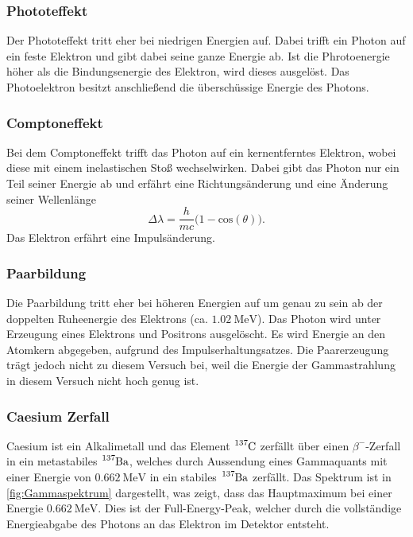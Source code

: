 \subsubsection{Phototeffekt}
\label{subsubsec:Phototeffekt}
Der Phototeffekt tritt eher bei niedrigen Energien auf. Dabei trifft ein Photon auf ein feste Elektron und gibt dabei seine ganze Energie ab. Ist die Phrotoenergie höher als die Bindungsenergie
des Elektron, wird dieses ausgelöst. Das Photoelektron besitzt anschließend die überschüssige Energie des Photons.

\subsubsection{Comptoneffekt}
\label{subsubsec:Comptoneffekt}
Bei dem Comptoneffekt trifft das Photon auf ein kernentferntes Elektron, wobei diese mit einem inelastischen Stoß wechselwirken.
Dabei gibt das Photon nur ein Teil seiner Energie ab und erfährt eine Richtungsänderung und eine Änderung seiner Wellenlänge
\begin{equation}
    \Delta \lambda = \frac{h}{m c} \biggl(1 - \text{cos}(\theta)\biggr).
\end{equation}
Das Elektron erfährt eine Impulsänderung.

\subsubsection{Paarbildung}
\label{subsubsec:Paarbildung}
Die Paarbildung tritt eher bei höheren Energien auf um genau zu sein ab der doppelten Ruheenergie des Elektrons (ca. $\qty{1.02}{\mega\eV}$). Das Photon wird unter Erzeugung eines 
Elektrons und Positrons ausgelöscht. Es wird Energie an den Atomkern abgegeben, aufgrund des Impulserhaltungsatzes. Die Paarerzeugung trägt jedoch nicht zu diesem Versuch bei, weil die 
Energie der Gammastrahlung in diesem Versuch nicht hoch genug ist.

\subsubsection{Caesium Zerfall}
\label{subsubsec:Caesium}
Caesium ist ein Alkalimetall und das Element $\ce{^{137}C}$ zerfällt über einen $\beta^-$-Zerfall in ein metastabiles $\ce{^{137}Ba}$, welches durch Aussendung eines Gammaquants mit einer 
Energie von $\qty{0.662}{\mega\eV}$ in ein stabiles $\ce{^{137}Ba}$ zerfällt. Das Spektrum ist in \autoref{fig:Gammaspektrum} dargestellt, was zeigt, dass das Hauptmaximum bei einer Energie
$\qty{0.662}{\mega\eV}$. Dies ist der Full-Energy-Peak, welcher durch die vollständige Energieabgabe des Photons an das Elektron im Detektor entsteht.

